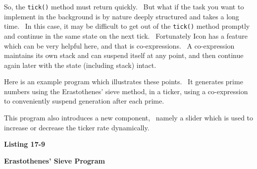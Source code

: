 So, the \texttt{tick()} method must return quickly. \ But what if the
task you want to implement in the background is by nature deeply
structured and takes a long time. \ In this case, it may be difficult
to get out of the \texttt{tick()} method promptly and continue in the
same state on the next tick. \ Fortunately Icon has a feature which can
be very helpful here, and that is co-expressions. \ A co-expression
maintains its own stack and can suspend itself at any point, and then
continue again later with the state (including stack) intact.

Here is an example program which illustrates these points. \ It
generates prime numbers using the Erastothenes' sieve
method, in a ticker, using a co-expression to conveniently suspend
generation after each prime.

This program also introduces a new component, \ namely a slider which is
used to increase or decrease the ticker rate dynamically.

{\sffamily\bfseries
Listing 17-9}

{\sffamily\bfseries
Erastothenes' Sieve Program}


